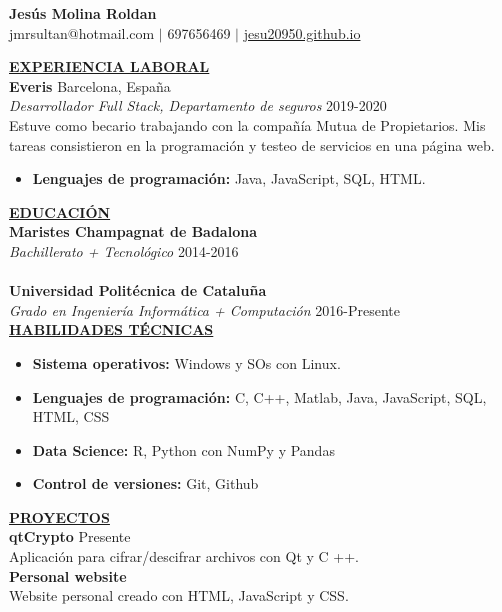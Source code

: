 \documentclass{article}
\begin{document}
	\begin{center}
		\thispagestyle{empty}
		\large \textbf{Jesús Molina Roldan\\}
		\normalsize jmr\textunderscore sultan@hotmail.com $\mid$ 697656469 $\mid$ \href{https://jesu20950.github.io/}{jesu20950.github.io} \\ 
		\hrulefill
	\end{center}
	
	\noindent \textbf{\underline{EXPERIENCIA LABORAL}} \\
	\noindent \textbf{Everis} \hfill Barcelona, España \\
	\textit{Desarrollador Full Stack, Departamento de seguros} \hfill 2019-2020 \\
	Estuve como becario trabajando con la compañía Mutua de Propietarios. Mis tareas consistieron en la programación y testeo de servicios en una página web.
	\begin{itemize}[noitemsep,nolistsep,leftmargin=*]
		\item {\textbf{Lenguajes de programación:} Java, JavaScript, SQL, HTML.}\\
	\end{itemize}
	

	\noindent \textbf{\underline{EDUCACIÓN}} \\
	\textbf{Maristes Champagnat de Badalona} \\
	\textit{Bachillerato + Tecnológico}  \hfill 2014-2016  \\ \\
	\textbf{Universidad Politécnica de Cataluña} \\
	\textit{Grado en Ingeniería Informática + Computación}  \hfill 2016-Presente \\
	

	\noindent \textbf{\underline{HABILIDADES TÉCNICAS}} \\
	\begin{itemize}[noitemsep,nolistsep,leftmargin=*]
		\item {\textbf{Sistema operativos:} Windows y SOs con Linux.}
		\item {\textbf{Lenguajes de programación:} C, C++, Matlab, Java, JavaScript, SQL, HTML, CSS}
		\item {\textbf{Data Science:} R, Python con NumPy y Pandas}
		\item {\textbf{Control de versiones:} Git, Github}\\
	\end{itemize}
	
		\noindent \textbf{\underline{PROYECTOS}} \\
	\noindent \textbf{qtCrypto}  \hfill  Presente \\
	Aplicación para cifrar/descifrar archivos con Qt y C ++. \\
	\noindent \textbf{Personal website}   \\
	Website personal creado con HTML, JavaScript y CSS. \\
\end{document}

